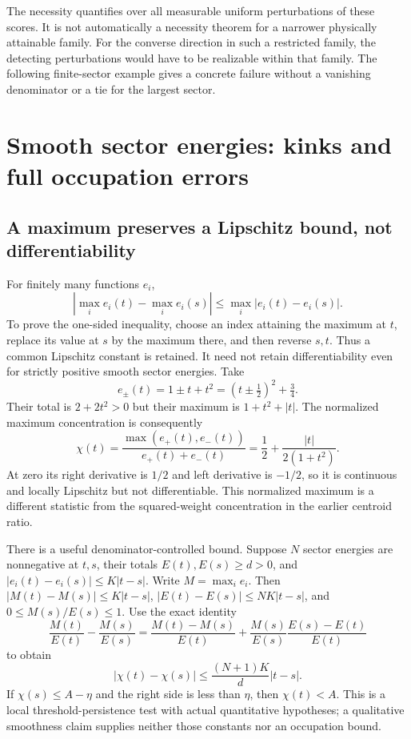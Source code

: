 \documentclass[11pt]{article}
\begin{document}
The necessity quantifies over all measurable uniform perturbations
of these scores. It is not automatically a necessity theorem for
a narrower physically attainable family. For the converse direction
in such a restricted family, the detecting perturbations would have
to be realizable within that family. The following finite-sector
example gives a concrete failure without a vanishing denominator
or a tie for the largest sector.

\section{Smooth sector energies: kinks and full occupation errors}
\subsection{A maximum preserves a Lipschitz bound, not differentiability}
For finitely many functions $e_i$,
\[
 |\max_i e_i(t)-\max_i e_i(s)|
 \leq\max_i|e_i(t)-e_i(s)|.
\]
To prove the one-sided inequality, choose an index attaining the
maximum at $t$, replace its value at $s$ by the maximum there,
and then reverse $s,t$. Thus a common Lipschitz constant is retained.
It need not retain differentiability even for strictly positive
smooth sector energies. Take
\[
 e_\pm(t)=1\pm t+t^2=(t\pm\tfrac12)^2+\tfrac34.
\]
Their total is $2+2t^2>0$ but their maximum is $1+t^2+|t|$.
The normalized maximum concentration is consequently
\[
 \chi(t)=\frac{\max(e_+(t),e_-(t))}{e_+(t)+e_-(t)}
 =\frac12+\frac{|t|}{2(1+t^2)}.
\]
At zero its right derivative is $1/2$ and left derivative is
$-1/2$, so it is continuous and locally Lipschitz but not
differentiable. This normalized maximum is a different statistic
from the squared-weight concentration in the earlier centroid ratio.

There is a useful denominator-controlled bound. Suppose $N$ sector
energies are nonnegative at $t,s$, their totals $E(t),E(s)\geq d>0$,
and $|e_i(t)-e_i(s)|\leq K|t-s|$. Write $M=\max_i e_i$.
Then $|M(t)-M(s)|\leq K|t-s|$,
$|E(t)-E(s)|\leq NK|t-s|$, and $0\leq M(s)/E(s)\leq1$.
Use the exact identity
\[
 \frac{M(t)}{E(t)}-\frac{M(s)}{E(s)}
 =\frac{M(t)-M(s)}{E(t)}
 +\frac{M(s)}{E(s)}\frac{E(s)-E(t)}{E(t)}
\]
to obtain
\begin{equation}\label{eq:maxconcentrationlip}
 |\chi(t)-\chi(s)|\leq\frac{(N+1)K}{d}|t-s|.
\end{equation}
If $\chi(s)\leq A-\eta$ and the right side is less than
$\eta$, then $\chi(t)<A$. This is a local threshold-persistence
test with actual quantitative hypotheses; a qualitative smoothness
claim supplies neither those constants nor an occupation bound.
\end{document}
